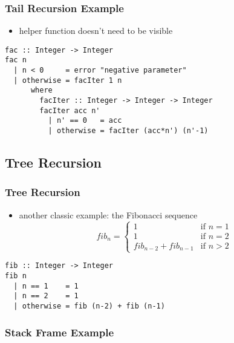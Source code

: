 \documentclass[dvipsnames]{beamer}
\theoremstyle{plain}
\begin{document}
\begin{frame}[fragile]
  \frametitle{Tail Recursion Example}

  \begin{itemize}
    \item helper function doesn't need to be visible
  \end{itemize}

  \begin{lstlisting}
fac :: Integer -> Integer
fac n
  | n < 0     = error "negative parameter"
  | otherwise = facIter 1 n
      where
        facIter :: Integer -> Integer -> Integer
        facIter acc n'
          | n' == 0   = acc
          | otherwise = facIter (acc*n') (n'-1)
  \end{lstlisting}
\end{frame}

\subsection{Tree Recursion}

\begin{frame}[fragile]
  \frametitle{Tree Recursion}

  \begin{itemize}
    \item another classic example: the Fibonacci sequence
    \[
      fib_n =
        \begin{cases}
          1                     & \mbox{if } n = 1\\
          1                     & \mbox{if } n = 2\\
          fib_{n-2} + fib_{n-1} & \mbox{if } n > 2
        \end{cases}
    \]
  \end{itemize}

  \begin{exampleblock}{}
    \begin{lstlisting}
fib :: Integer -> Integer
fib n
  | n == 1    = 1
  | n == 2    = 1
  | otherwise = fib (n-2) + fib (n-1)
    \end{lstlisting}
  \end{exampleblock}
\end{frame}

\begin{frame}[fragile]
  \frametitle{Stack Frame Example}

  \begin{center}
  \end{center}
\end{frame}
\end{document}
